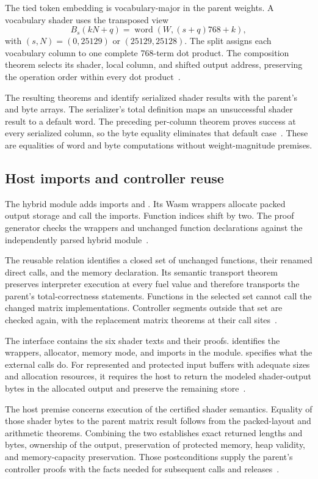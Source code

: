 The tied token embedding is vocabulary-major in the parent weights.  A vocabulary shader uses the transposed view
\[
B_s(kN+q)=\operatorname{word}(W,(s+q)768+k),
\]
with $(s,N)=(0,25129)$ or $(25129,25128)$.  The split assigns each vocabulary column to one complete 768-term dot product.  The composition theorem selects its shader, local column, and shifted output address, preserving the operation order within every dot product~\cite{wg-packedsource}.

The resulting theorems  and  identify serialized shader results with the parent's  and  byte arrays.  The serializer's total definition maps an unsuccessful shader result to a default word.  The preceding per-column theorem proves success at every serialized column, so the byte equality eliminates that default case~\cite{wg-packedshader}.  These are equalities of word and byte computations without weight-magnitude premises.

\subsection{Host imports and controller reuse}

The hybrid module adds imports  and .  Its Wasm wrappers allocate packed output storage and call the imports.  Function indices shift by two.  The proof generator checks the wrappers and unchanged function declarations against the independently parsed hybrid module~\cite{wg-build,wg-backend}.

The reusable  relation identifies a closed set of unchanged functions, their renamed direct calls, and the memory declaration.  Its semantic transport theorem preserves interpreter execution at every fuel value and therefore transports the parent's total-correctness statements.  Functions in the selected set cannot call the changed matrix implementations.  Controller segments outside that set are checked again, with the replacement matrix theorems at their call sites~\cite{wg-transport,wg-composition}.

The interface  contains the six shader texts and their  proofs.   identifies the wrappers, allocator, memory mode, and imports in the module.   specifies what the external calls do.  For represented and protected input buffers with adequate sizes and allocation resources, it requires the host to return the modeled shader-output bytes in the allocated output and preserve the remaining store~\cite{wg-backend}.

The host premise concerns execution of the certified shader semantics.  Equality of those shader bytes to the parent matrix result follows from the packed-layout and arithmetic theorems.  Combining the two establishes exact returned lengths and bytes, ownership of the output, preservation of protected memory, heap validity, and memory-capacity preservation.  Those postconditions supply the parent's controller proofs with the facts needed for subsequent calls and releases~\cite{wg-packedshader,wg-backend}.

